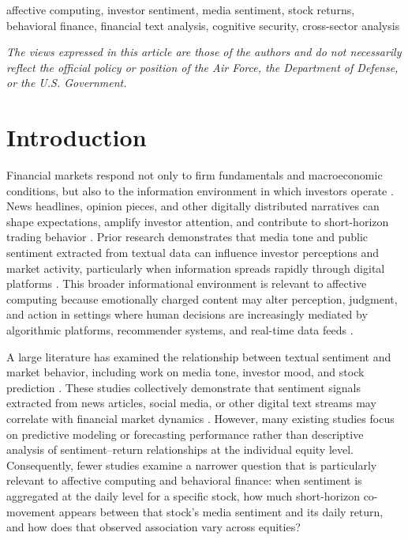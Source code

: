\documentclass[lettersize,journal]{IEEEtran}
\begin{document}
\begin{IEEEkeywords}
affective computing, investor sentiment, media sentiment, stock returns, behavioral finance, financial text analysis, cognitive security, cross-sector analysis
\end{IEEEkeywords}

\textit{The views expressed in this article are those of the authors and do not necessarily reflect the official policy or position of the Air Force, the Department of Defense, or the U.S. Government.}

\section{Introduction}
\nocite{*}

Financial markets respond not only to firm fundamentals and macroeconomic conditions, but also to the information environment in which investors operate \cite{campbell1997econometrics}. 
News headlines, opinion pieces, and other digitally distributed narratives can shape expectations, amplify investor attention, and contribute to short-horizon trading behavior \cite{tetlock2007giving, LI2014826, CHANG2025101045}. 
Prior research demonstrates that media tone and public sentiment extracted from textual data can influence investor perceptions and market activity, particularly when information spreads rapidly through digital platforms \cite{bollen2011twitter, zhang2020stock}. 
This broader informational environment is relevant to affective computing because emotionally charged content may alter perception, judgment, and action in settings where human decisions are increasingly mediated by algorithmic platforms, recommender systems, and real-time data feeds \cite{hutto2014vader}.

A large literature has examined the relationship between textual sentiment and market behavior, including work on media tone, investor mood, and stock prediction \cite{tetlock2007giving, bollen2011twitter, zhang2020stock, LI2014826}. 
These studies collectively demonstrate that sentiment signals extracted from news articles, social media, or other digital text streams may correlate with financial market dynamics \cite{CHANG2025101045}. 
However, many existing studies focus on predictive modeling or forecasting performance rather than descriptive analysis of sentiment–return relationships at the individual equity level. 
Consequently, fewer studies examine a narrower question that is particularly relevant to affective computing and behavioral finance: when sentiment is aggregated at the daily level for a specific stock, how much short-horizon co-movement appears between that stock's media sentiment and its daily return, and how does that observed association vary across equities?
\end{document}
